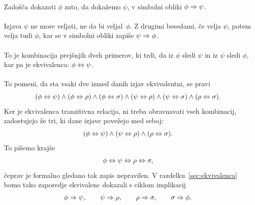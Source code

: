 \paragraph{}
%
Zadošča dokazati $\phi$ zato, da dokažemo $\psi$, v simbolni obliki $\phi \Rightarrow \psi$.

\paragraph{}
%
Izjava $\psi$ ne more veljati, ne da bi veljal~$\phi$. Z drugimi
besedami, če velja $\psi$, potem velja tudi $\phi$, kar se v simbolni obliki
zapiše $\psi \Rightarrow \phi$.

\paragraph{}
%
To je kombinacija prejšnjih dveh primerov, ki trdi, da iz $\phi$ sledi
$\psi$ in iz $\psi$ sledi $\phi$, kar pa je ekvivalenca:
%
$\phi \Leftrightarrow \psi$.

\paragraph{}
%
To pomeni, da sta vsaki dve izmed danih izjav ekvivalentni, se pravi
%
\begin{equation*}
  (\phi \Leftrightarrow \psi) \land (\phi \Leftrightarrow \rho) \land (\phi \Leftrightarrow \sigma) \land (\psi \Leftrightarrow \rho)
  \land (\psi \Leftrightarrow \sigma) \land (\rho \Leftrightarrow \sigma).
\end{equation*}
%
Ker je ekvivalenca tranzitivna relacija, ni treba obravnavati vseh
kombinacij, zadostujejo že tri, ki dane izjave povežejo med seboj:
%
\begin{equation*}
  (\phi \Leftrightarrow \psi) \land (\psi \Leftrightarrow \rho) \land (\rho \Leftrightarrow \sigma).
\end{equation*}
%
To pišemo krajše
%
\begin{equation*}
  \phi \Leftrightarrow \psi \Leftrightarrow \rho \Leftrightarrow \sigma,
\end{equation*}
%
čeprav je formalno gledano tak zapis nepravilen. V
razdelku~\ref{sec:ekvivalenca} bomo tako zaporedje
ekvivalenc dokazali s ciklom implikacij
%
\begin{equation*}
\phi \Rightarrow \psi, \qquad
\psi \Rightarrow \rho, \qquad
\rho \Rightarrow \sigma, \qquad
\sigma \Rightarrow \phi.
\end{equation*}


